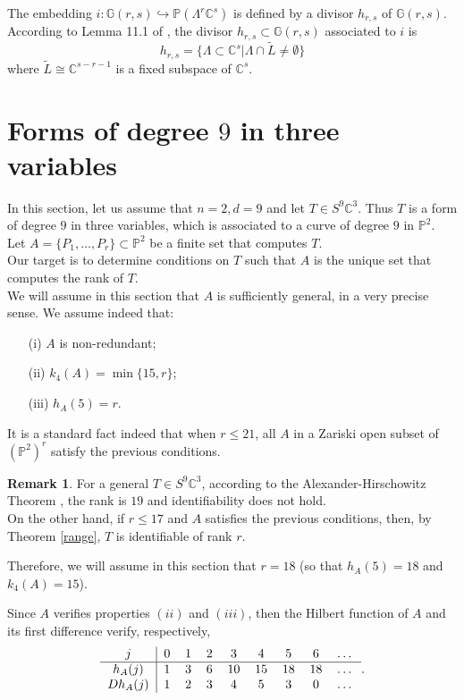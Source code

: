 \documentclass{amsart}
\newcommand{\C}{\mathbb{C}}
\newcommand{\Pj}{\mathbb{P}}
\newcommand{\G}{\mathbb{G}}
\theoremstyle{definition}
\newtheorem{rem0}[thm0]{Remark}
\begin{document}
The embedding $i : \G(r,s) \hookrightarrow \Pj(\Lambda^{r}\C^{s}) $ is defined by a divisor $ h_{r,s}$ of $\G(r,s)$.
According to Lemma 11.1 of \cite{Dolgachev},  the divisor $ h_{r,s} \subset \G(r,s) $ associated to $ i $ is
$$ h_{r,s} = \{\Lambda \subset \C^{s} | \Lambda \cap \tilde{L} \not= \emptyset \}  $$
where $ \tilde{L} \cong \C^{s-r-1} $ is a fixed subspace of $\C^s$.




\section{Forms of degree $9$ in three variables}\label{sec:nonics18}

In this section, let us  assume that $ n = 2, d = 9 $ and let $ T \in S^{9} \C^{3} $. Thus $T$ is a form of degree $9$ in three variables, which
is associated to a curve of degree $9$ in $\Pj^2$.\\

Let $ A = \{P_{1},\ldots,P_{r}\} \subset \Pj^{2} $ be a finite set that computes $ T $.\\
Our target is to determine conditions on $T$ such that $A$ is the unique set
that computes the rank of $T$.\\ 

We will assume in this section that $A$ is sufficiently general, in a very precise sense.
 We assume indeed that:
\begin{itemize}
\item[(i)] $ A $ is non-redundant;
\item[(ii)] $ k_{4}(A) = \min\{15,r\}  $;
\item[(iii)] $ h_{A}(5) = r $.
\end{itemize}
It is a standard fact indeed that when $ r\leq 21$, all $A$ in a Zariski open subset of $(\Pj^2)^r$ satisfy the previous conditions.

\begin{rem0} For a general $ T \in S^{9} \C^{3} $, according to the Alexander-Hirschowitz Theorem \cite{AlexHir95}, the rank is $19$ and identifiability does not hold.\\
On the other hand, if $ r \leq 17 $ and $A$ satisfies the previous conditions, then, by Theorem \ref{range}, $ T $ is identifiable of rank $ r $. 
\end{rem0}

Therefore, we will assume in this section that $ r = 18 $ (so that $h_A(5)=18$ and $k_4(A)=15$).

Since $ A $ verifies properties $ (ii) $ and $ (iii) $, then the Hilbert function of $ A $ and its first difference verify, respectively,
\begin{equation}\label{eq:hDhA}
\begin{tabular}{c|cccccccc}
$j$ & $0$ & $1$ & $2$ &   $3$ &   $4$ &   $5$ &    $6$ &  $\dots$ \\  \hline
$h_{A}(j)$ & $1$ & $3$ &   $6$ &   $10$ &   $15$ &   $18$ & $ 18 $ & $\dots$ \cr
$Dh_{A}(j)$ & $1$ & $2$ &   $3$ &   $4$ &   $5$ & $3$ & $ 0 $ & $\dots$ \cr
\end{tabular}.
\end{equation}
\end{document}
